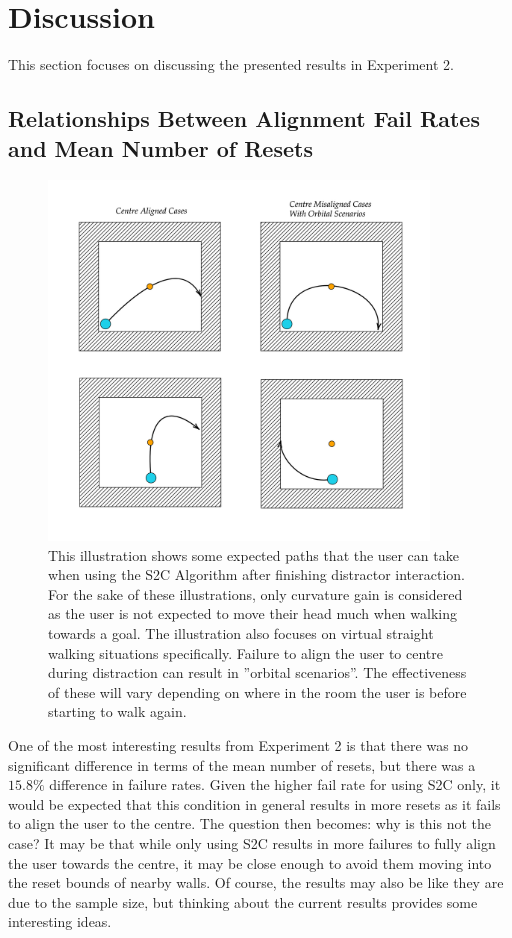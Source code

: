 \section{Discussion}\label{sec:ex2discussion}
This section focuses on discussing the presented results in Experiment 2.

\subsection{Relationships Between Alignment Fail Rates and Mean Number of Resets}\label{sec:orbitalCases}
\begin{figure}[tbph]
    \centering
    \includegraphics[width=0.9\textwidth]{figures/graphs/orbitalcases.png}
    \caption[Various S2C Redirection Scenarios During Success/Failure of Centre Alignment]{This illustration shows some expected paths that the user can take when using the S2C Algorithm after finishing distractor interaction. For the sake of these illustrations, only curvature gain is considered as the user is not expected to move their head much when walking towards a goal. The illustration also focuses on virtual straight walking situations specifically. Failure to align the user to centre during distraction can result in ''orbital scenarios''. The effectiveness of these will vary depending on where in the room the user is before starting to walk again.}
    \label{fig:orbitalCases}
\end{figure}

One of the most interesting results from Experiment 2 is that there was no significant difference in terms of the mean number of resets, but there was a $15.8\%$ difference in failure rates. Given the higher fail rate for using S2C only, it would be expected that this condition in general results in more resets as it fails to align the user to the centre. The question then becomes: why is this not the case? It may be that while only using S2C results in more failures to fully align the user towards the centre, it may be close enough to avoid them moving into the reset bounds of nearby walls. Of course, the results may also be like they are due to the sample size, but thinking about the current results provides some interesting ideas. 

